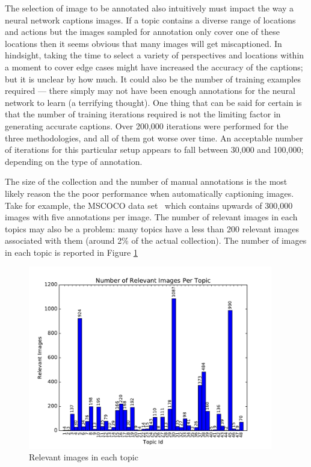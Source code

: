 The selection of image to be annotated also intuitively must impact the way a neural network captions images. If a topic contains a diverse range of locations and actions but the images sampled for annotation only cover one of these locations then it seems obvious that many images will get miscaptioned. In hindsight, taking the time to select a variety of perspectives and locations within a moment to cover edge cases might have increased the accuracy of the captions; but it is unclear by how much. It could also be the number of training examples required --- there simply may not have been enough annotations for the neural network to learn (a terrifying thought). One thing that can be said for certain is that the number of training iterations required is not the limiting factor in generating accurate captions. Over 200,000 iterations were performed for the three methodologies, and all of them got worse over time. An acceptable number of iterations for this particular setup appears to fall between 30,000 and 100,000; depending on the type of annotation.

The size of the collection and the number of manual annotations is the most likely reason the the poor performance when automatically captioning images. Take for example, the MSCOCO data set~\cite{lin2014microsoft} which contains upwards of 300,000 images with five annotations per image. The number of relevant images in each topics may also be a problem: many topics have a less than 200 relevant images associated with them (around 2\% of the actual collection). The number of images in each topic is reported in Figure \ref{fig:relevant-images}

\begin{figure}[h]
    \centering
    \includegraphics[width=0.95\textwidth]{graphs/relevant-images}
    \caption{Relevant images in each topic}
    \label{fig:relevant-images}
\end{figure}


